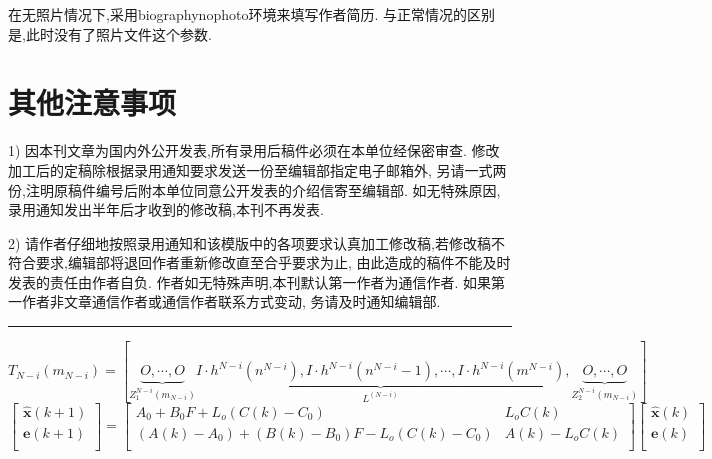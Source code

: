 \documentclass{Style/aas}
\begin{document}
\begin{multicols}{2}
在无照片情况下,采用biographynophoto环境来填写作者简历.
与正常情况的区别是,此时没有了照片文件这个参数.

\section{其他注意事项}

1) 因本刊文章为国内外公开发表,所有录用后稿件必须在本单位经保密审查.
修改加工后的定稿除根据录用通知要求发送一份至编辑部指定电子邮箱外,
另请一式两份,注明原稿件编号后附本单位同意公开发表的介绍信寄至编辑部.
如无特殊原因,录用通知发出半年后才收到的修改稿,本刊不再发表.

2)
请作者仔细地按照录用通知和该模版中的各项要求认真加工修改稿,若修改稿不符合要求,编辑部将退回作者重新修改直至合乎要求为止,
由此造成的稿件不能及时发表的责任由作者自负.
作者如无特殊声明,本刊默认第一作者为通信作者.
如果第一作者非文章通信作者或通信作者联系方式变动,
务请及时通知编辑部.


\end{multicols}%
\vskip1mm
\hrule
\begin{equation}
T_{N-i}(m_{N-i})= \left[ \underbrace{O,\cdots,
O}_{Z_1^{N-i}(m_{N-i})} \underbrace{I \cdot h^{N-i}(n^{N-i}), I
\cdot h^{N-i}(n^{N-i}-1),\cdots, I \cdot
h^{N-i}(m^{N-i})}_{L^{(N-i)}},\underbrace{O,\cdots,
O}_{Z_2^{N-i}(m_{N-i})} \right]\tag{3}
\end{equation}
\begin{equation} \left[
  \begin{array}{c}
    \hat{{\pmb x}}(k+1) \\
    {\pmb e}(k+1)\\
  \end{array}
\right]=\left[
  \begin{array}{cc}
    A_0+B_0F+L_o(C(k)-C_0) & L_oC(k) \\
    (A(k)-A_0)+(B(k)-B_0)F-L_o(C(k)-C_0) & A(k)-L_oC(k) \\
  \end{array}
\right]\left[
  \begin{array}{c}
    \hat{{\pmb x}}(k) \\
    {\pmb e} (k)\\
  \end{array}
\right]\tag{4}
\end{equation}
\begin{multicols}{2}%

\end{multicols}%
\end{document}

